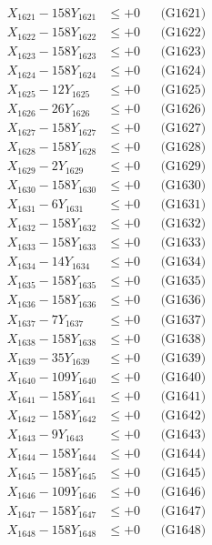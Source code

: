 \documentclass[a4paper,10pt]{article}
\begin{document}
{\begin{align}
\allowbreak
X_{1621} - 158Y_{1621} &\leq +0 && \text{(G1621)} \\
X_{1622} - 158Y_{1622} &\leq +0 && \text{(G1622)} \\
X_{1623} - 158Y_{1623} &\leq +0 && \text{(G1623)} \\
X_{1624} - 158Y_{1624} &\leq +0 && \text{(G1624)} \\
X_{1625} - 12Y_{1625} &\leq +0 && \text{(G1625)} \\
X_{1626} - 26Y_{1626} &\leq +0 && \text{(G1626)} \\
X_{1627} - 158Y_{1627} &\leq +0 && \text{(G1627)} \\
X_{1628} - 158Y_{1628} &\leq +0 && \text{(G1628)} \\
X_{1629} - 2Y_{1629} &\leq +0 && \text{(G1629)} \\
X_{1630} - 158Y_{1630} &\leq +0 && \text{(G1630)} \\
\allowbreak
X_{1631} - 6Y_{1631} &\leq +0 && \text{(G1631)} \\
X_{1632} - 158Y_{1632} &\leq +0 && \text{(G1632)} \\
X_{1633} - 158Y_{1633} &\leq +0 && \text{(G1633)} \\
X_{1634} - 14Y_{1634} &\leq +0 && \text{(G1634)} \\
X_{1635} - 158Y_{1635} &\leq +0 && \text{(G1635)} \\
X_{1636} - 158Y_{1636} &\leq +0 && \text{(G1636)} \\
X_{1637} - 7Y_{1637} &\leq +0 && \text{(G1637)} \\
X_{1638} - 158Y_{1638} &\leq +0 && \text{(G1638)} \\
X_{1639} - 35Y_{1639} &\leq +0 && \text{(G1639)} \\
X_{1640} - 109Y_{1640} &\leq +0 && \text{(G1640)} \\
\allowbreak
X_{1641} - 158Y_{1641} &\leq +0 && \text{(G1641)} \\
X_{1642} - 158Y_{1642} &\leq +0 && \text{(G1642)} \\
X_{1643} - 9Y_{1643} &\leq +0 && \text{(G1643)} \\
X_{1644} - 158Y_{1644} &\leq +0 && \text{(G1644)} \\
X_{1645} - 158Y_{1645} &\leq +0 && \text{(G1645)} \\
X_{1646} - 109Y_{1646} &\leq +0 && \text{(G1646)} \\
X_{1647} - 158Y_{1647} &\leq +0 && \text{(G1647)} \\
X_{1648} - 158Y_{1648} &\leq +0 && \text{(G1648)} \\

\end{align}}
\end{document}
